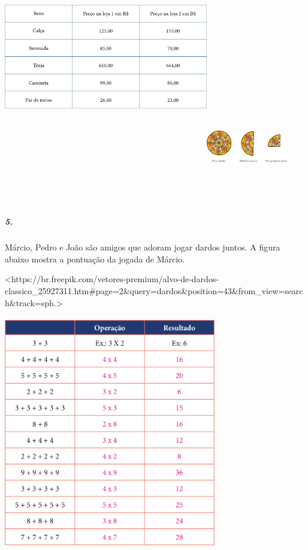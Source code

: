 \includegraphics[width=3.51191in,height=5.03125in]{media/image102.png}\includegraphics[width=1.39487in,height=1.89949in]{media/image103.png}

\subparagraph{5.}\label{section-93}

Márcio, Pedro e João são amigos que adoram jogar dardos juntos. A figura
abaixo mostra a pontuação da jogada de Márcio.

\textless{}https://br.freepik.com/vetores-premium/alvo-de-dardos-classico\_25927311.htm\#page=2\&query=dardos\&position=43\&from\_view=search\&track=sph.\textgreater{}

\includegraphics[width=3.64583in,height=4.02083in]{media/image104.png}


